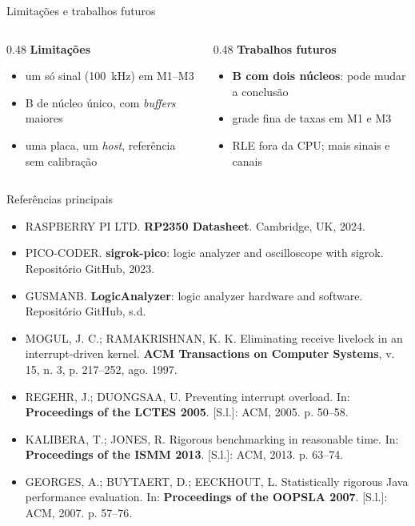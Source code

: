 \documentclass{UFAL-beamer-moderno}
\newcommand{\en}[1]{\textit{#1}}
\begin{document}
\begin{frame}{Limitações e trabalhos futuros}
  \begin{columns}[T]
    \begin{column}{0.48\textwidth}
      \textbf{Limitações}
      \begin{itemize}
        \setlength{\itemsep}{6pt}
        \item um só sinal (\SI{100}{kHz}) em M1--M3
        \item B de núcleo único, com \en{buffers} maiores
        \item uma placa, um \en{host}, referência sem calibração
      \end{itemize}
    \end{column}
    \begin{column}{0.48\textwidth}
      \textbf{Trabalhos futuros}
      \begin{itemize}
        \setlength{\itemsep}{6pt}
        \item \textbf{B com dois núcleos}: pode mudar a conclusão
        \item grade fina de taxas em M1 e M3
        \item RLE fora da CPU; mais sinais e canais
      \end{itemize}
    \end{column}
  \end{columns}
\end{frame}

\begin{frame}{Referências principais}
  \footnotesize
  \begin{itemize}
    \setlength{\itemsep}{3pt}
    \item RASPBERRY PI LTD. \textbf{RP2350 Datasheet}. Cambridge, UK, 2024.
    \item PICO-CODER. \textbf{sigrok-pico}: logic analyzer and oscilloscope with sigrok.
          Repositório GitHub, 2023.
    \item GUSMANB. \textbf{LogicAnalyzer}: logic analyzer hardware and software.
          Repositório GitHub, s.d.
    \item MOGUL, J. C.; RAMAKRISHNAN, K. K. Eliminating receive livelock in an
          interrupt-driven kernel. \textbf{ACM Transactions on Computer Systems}, v. 15,
          n. 3, p. 217--252, ago. 1997.
    \item REGEHR, J.; DUONGSAA, U. Preventing interrupt overload. In: \textbf{Proceedings
            of the LCTES 2005}. [S.l.]: ACM, 2005. p. 50--58.
    \item KALIBERA, T.; JONES, R. Rigorous benchmarking in reasonable time. In:
          \textbf{Proceedings of the ISMM 2013}. [S.l.]: ACM, 2013. p. 63--74.
    \item GEORGES, A.; BUYTAERT, D.; EECKHOUT, L. Statistically rigorous Java performance
          evaluation. In: \textbf{Proceedings of the OOPSLA 2007}. [S.l.]: ACM, 2007. p.
          57--76.
  \end{itemize}
  \vspace{2pt}
\end{frame}
\end{document}
